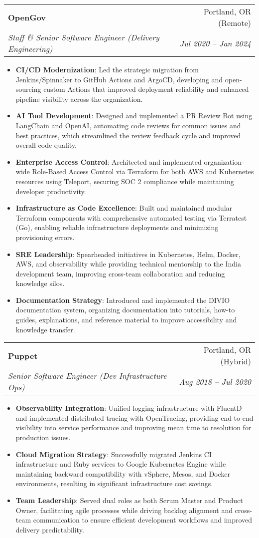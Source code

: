 \documentclass[letterpaper,11pt]{article}
\makeatletter
\newcommand{\resumeItem}[2]{
\item[\textsc{}]\small{
    \textbf{#1}{: #2 \vspace{-2pt}}
  }
}
\newcommand{\resumeSubheading}[4]{
  \vspace{-1pt}\item
    \begin{tabular*}{0.97\textwidth}[t]{l@{\extracolsep{\fill}}r}
      \textbf{#1} & #2 \\
      \textit{\small#3} & \textit{\small #4} \\
    \end{tabular*}\vspace{-5pt}
}
\newcommand{\resumeItemListStart}{\begin{itemize}}
\newcommand{\resumeItemListEnd}{\end{itemize}\vspace{-5pt}}
\makeatother
\begin{document}
    \resumeSubheading
      {OpenGov}{Portland, OR (Remote)}
      {Staff \& Senior Software Engineer (Delivery Engineering)}{Jul 2020 -- Jan 2024}
      \resumeItemListStart
        \resumeItem{CI/CD Modernization}
          {Led the strategic migration from Jenkins/Spinnaker to GitHub Actions and ArgoCD, developing and open-sourcing custom Actions that improved deployment reliability and enhanced pipeline visibility across the organization.}
        \resumeItem{AI Tool Development}
          {Designed and implemented a PR Review Bot using LangChain and OpenAI, automating code reviews for common issues and best practices, which streamlined the review feedback cycle and improved overall code quality.}
        \resumeItem{Enterprise Access Control}
          {Architected and implemented organization-wide Role-Based Access Control via Terraform for both AWS and Kubernetes resources using Teleport, securing SOC 2 compliance while maintaining developer productivity.}
        \resumeItem{Infrastructure as Code Excellence}
          {Built and maintained modular Terraform components with comprehensive automated testing via Terratest (Go), enabling reliable infrastructure deployments and minimizing provisioning errors.}
        \resumeItem{SRE Leadership}
          {Spearheaded initiatives in Kubernetes, Helm, Docker, AWS, and observability while providing technical mentorship to the India development team, improving cross-team collaboration and reducing knowledge silos.}
        \resumeItem{Documentation Strategy}
          {Introduced and implemented the DIVIO documentation system, organizing documentation into tutorials, how-to guides, explanations, and reference material to improve accessibility and knowledge transfer.}
      \resumeItemListEnd

    \resumeSubheading
      {Puppet}{Portland, OR (Hybrid)}
      {Senior Software Engineer (Dev Infrastructure Ops)}{Aug 2018 -- Jul 2020}
      \resumeItemListStart
        \resumeItem{Observability Integration}
          {Unified logging infrastructure with FluentD and implemented distributed tracing with OpenTracing, providing end-to-end visibility into service performance and improving mean time to resolution for production issues.}
        \resumeItem{Cloud Migration Strategy}
          {Successfully migrated Jenkins CI infrastructure and Ruby services to Google Kubernetes Engine while maintaining backward compatibility with vSphere, Mesos, and Docker environments, resulting in significant infrastructure cost savings.}
        \resumeItem{Team Leadership}
          {Served dual roles as both Scrum Master and Product Owner, facilitating agile processes while driving backlog alignment and cross-team communication to ensure efficient development workflows and improved delivery predictability.}
      \resumeItemListEnd
\end{document}
